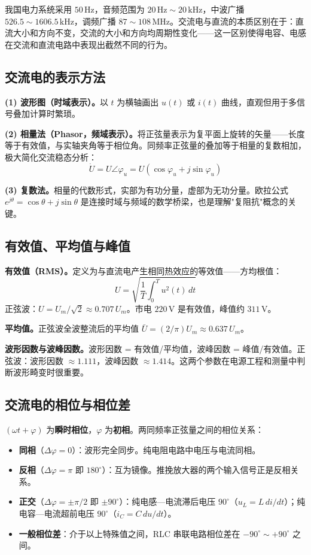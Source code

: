\documentclass[12pt,UTF8]{ctexbook}
\begin{document}
我国电力系统采用 $50\,\mathrm{Hz}$，音频范围为 $20\,\mathrm{Hz}\sim20\,\mathrm{kHz}$，中波广播 $526.5\sim 1606.5\,\mathrm{kHz}$，调频广播 $87\sim108\,\mathrm{MHz}$。交流电与直流的本质区别在于：直流大小和方向不变，交流的大小和方向均周期性变化——这一区别使得电容、电感在交流和直流电路中表现出截然不同的行为。

\subsection{交流电的表示方法}

\textbf{(1) 波形图（时域表示）。}以 $t$ 为横轴画出 $u(t)$ 或 $i(t)$ 曲线，直观但用于多信号叠加计算时繁琐。

\textbf{(2) 相量法（Phasor，频域表示）。}将正弦量表示为复平面上旋转的矢量——长度等于有效值，与实轴夹角等于相位角。同频率正弦量的叠加等于相量的复数相加，极大简化交流稳态分析：
\[
\dot{U} = U\angle\varphi_u = U(\cos\varphi_u + j\sin\varphi_u)
\]

\textbf{(3) 复数法。}相量的代数形式，实部为有功分量，虚部为无功分量。欧拉公式 $e^{j\theta} = \cos\theta + j\sin\theta$ 是连接时域与频域的数学桥梁，也是理解"复阻抗"概念的关键。

\subsection{有效值、平均值与峰值}

\textbf{有效值（RMS）。}定义为与直流电产生相同热效应的等效值——方均根值：
\[
U = \sqrt{\frac{1}{T}\int_0^T u^2(t)\,dt}
\]
正弦波：$U = U_m/\sqrt{2} \approx 0.707\,U_m$。市电 $220\,\mathrm{V}$ 是有效值，峰值约 $311\,\mathrm{V}$。

\textbf{平均值。}正弦波全波整流后的平均值 $\bar{U} = (2/\pi)U_m \approx 0.637\,U_m$。

\textbf{波形因数与波峰因数。}波形因数 = 有效值/平均值，波峰因数 = 峰值/有效值。正弦波：波形因数 $\approx 1.111$，波峰因数 $\approx 1.414$。这两个参数在电源工程和测量中判断波形畸变时很重要。

\subsection{交流电的相位与相位差}

$(\omega t + \varphi)$ 为\textbf{瞬时相位}，$\varphi$ 为\textbf{初相}。两同频率正弦量之间的相位关系：

\begin{itemize}
  \item \textbf{同相}（$\Delta\varphi = 0$）：波形完全同步。纯电阻电路中电压与电流同相。
  \item \textbf{反相}（$\Delta\varphi = \pi$ 即 $180^\circ$）：互为镜像。推挽放大器的两个输入信号正是反相关系。
  \item \textbf{正交}（$\Delta\varphi = \pm\pi/2$ 即 $\pm90^\circ$）：纯电感—电流滞后电压 $90^\circ$（$u_L = L\,di/dt$）；纯电容—电流超前电压 $90^\circ$（$i_C = C\,du/dt$）。
  \item \textbf{一般相位差}：介于以上特殊值之间，RLC 串联电路相位差在 $-90^\circ\sim+90^\circ$ 之间。
\end{itemize}
\end{document}

